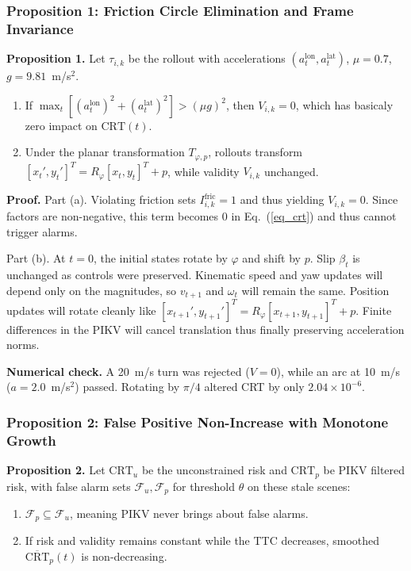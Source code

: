 \documentclass[preprint,12pt]{elsarticle}
\begin{document}
\subsubsection{Proposition 1: Friction Circle Elimination and Frame Invariance}
\textbf{Proposition 1.} Let $\tau_{i,k}$ be the rollout with accelerations $(a^{\text{lon}}_t, a^{\text{lat}}_t)$, $\mu = 0.7$, $g = 9.81$~m/s$^2$.
\begin{enumerate}
    \item[(a)] If $\max_t [(a^{\text{lon}}_t)^2 + (a^{\text{lat}}_t)^2] > (\mu g)^2$, then $V_{i,k} = 0$, which has basicaly zero impact on $\text{CRT}(t)$.
    \item[(b)] Under the planar transformation $T_{\varphi, {p}}$, rollouts transform $[x_t', y_t']^T = R_\varphi [x_t, y_t]^T + {p}$, while validity $V_{i,k}$ unchanged.
\end{enumerate}

\textbf{Proof.} Part (a). Violating friction sets $I^{\text{fric}}_{i,k} = 1$ and thus yielding $V_{i,k} = 0$. Since factors are non-negative, this term becomes 0 in Eq.~(\ref{eq_crt}) and thus cannot trigger alarms.

Part (b). At $t=0$, the initial states rotate by $\varphi$ and shift by ${p}$. Slip $\beta_t$ is unchanged as controls were preserved. Kinematic speed and yaw updates will depend only on the magnitudes, so $v_{t+1}$ and $\omega_t$ will remain the same. Position updates will rotate cleanly like $[x_{t+1}', y_{t+1}']^T = R_\varphi [x_{t+1}, y_{t+1}]^T + {p}$. Finite differences in the PIKV will cancel translation thus finally preserving acceleration norms.

\textbf{Numerical check.} A 20~m/s turn was rejected ($V=0$), while an arc at 10~m/s ($a=2.0$~m/s$^2$) passed. Rotating by $\pi/4$ altered CRT by only $2.04 \times 10^{-6}$.

\subsubsection{Proposition 2: False Positive Non-Increase with Monotone Growth}
\textbf{Proposition 2.} Let $\text{CRT}_{u}$ be the unconstrained risk and $\text{CRT}_{p}$ be PIKV filtered risk, with false alarm sets $\mathcal{F}_u, \mathcal{F}_p$ for threshold $\theta$ on these stale scenes:
\begin{enumerate}
    \item[(a)] $\mathcal{F}_p \subseteq \mathcal{F}_u$, meaning PIKV never brings about false alarms.
    \item[(b)] If risk and validity remains constant while the TTC decreases, smoothed $\overline{\text{CRT}}_p(t)$ is non-decreasing.
\end{enumerate}
\end{document}
